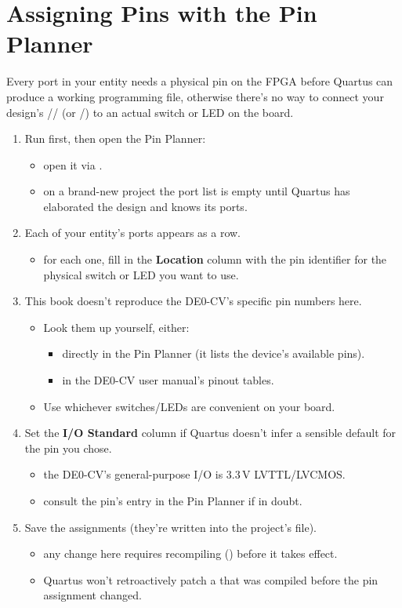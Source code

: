 \section{Assigning Pins with the Pin Planner}
\label{q:5}
Every port in your entity needs a physical pin on the FPGA before Quartus can produce a working
programming file, otherwise there's no way to connect your design's // (or
/) to an actual switch or LED on the board.
\begin{enumerate}
  \item Run  first, then open the Pin
    Planner:
  \begin{itemize}
    \item open it via .
    \item on a brand-new project the port list is empty until Quartus has elaborated the design and
      knows its ports.
  \end{itemize}
  \item Each of your entity's ports appears as a row.
  \begin{itemize}
    \item for each one, fill in the \textbf{Location} column with the pin identifier for the
      physical switch or LED you want to use.
  \end{itemize}
  \item This book doesn't reproduce the DE0-CV's specific pin numbers here.
  \begin{itemize}
    \item Look them up yourself, either:
    \begin{itemize}
      \item directly in the Pin Planner (it lists the device's available pins).
      \item in the DE0-CV user manual's pinout tables.
    \end{itemize}
    \item Use whichever switches/LEDs are convenient on your board.
  \end{itemize}
  \item Set the \textbf{I/O Standard} column if Quartus doesn't infer a sensible default for the
    pin you chose.
  \begin{itemize}
    \item the DE0-CV's general-purpose I/O is 3.3\,V LVTTL/LVCMOS.
    \item consult the pin's entry in the Pin Planner if in doubt.
  \end{itemize}
  \item Save the assignments (they're written into the project's  file).
  \begin{itemize}
    \item any change here requires recompiling () before it takes effect.
    \item Quartus won't retroactively patch a  that was compiled before the pin
      assignment changed.
  \end{itemize}
\end{enumerate}

